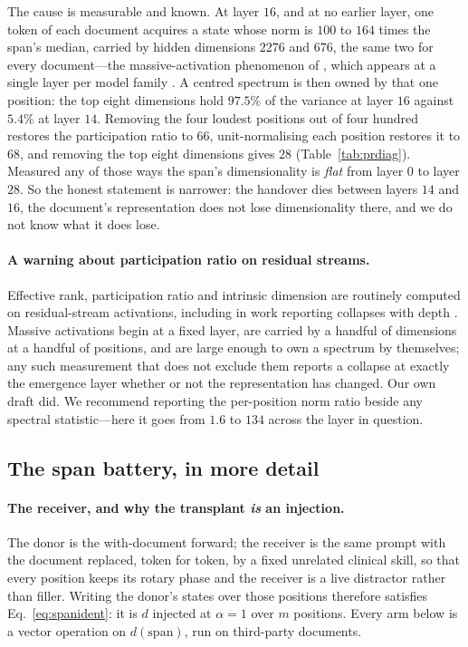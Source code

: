\documentclass{article}
\newcommand{\dvec}{\ensuremath{d}}
\begin{document}
The cause is measurable and known. At layer $16$, and at no earlier layer, one
token of each document acquires a state whose norm is $100$ to $164$ times the
span's median, carried by hidden dimensions $2276$ and $676$, the same two for
every document---the massive-activation phenomenon of \citet{sun2024massive},
which appears at a single layer per model family \citep{shi2026melayer}. A
centred spectrum is then owned by that one position: the top eight dimensions
hold $97.5\%$ of the variance at layer $16$ against $5.4\%$ at layer $14$.
Removing the four loudest positions out of four hundred restores the
participation ratio to $66$, unit-normalising each position restores it to $68$,
and removing the top eight dimensions gives $28$ (Table~\ref{tab:prdiag}).
Measured any of those ways the span's dimensionality is \emph{flat} from layer
$0$ to layer $28$. So the honest statement is narrower: the handover dies
between layers $14$ and $16$, the document's representation does not lose
dimensionality there, and we do not know what it does lose.



\paragraph{A warning about participation ratio on residual streams.} Effective
rank, participation ratio and intrinsic dimension are routinely computed on
residual-stream activations, including in work reporting collapses with depth
\citep{fernando2026residualspectral, sarkar2026causaldim}. Massive activations
begin at a fixed layer, are carried by a handful of dimensions at a handful of
positions, and are large enough to own a spectrum by themselves; any such
measurement that does not exclude them reports a collapse at exactly the
emergence layer whether or not the representation has changed. Our own draft
did. We recommend reporting the per-position norm ratio beside any spectral
statistic---here it goes from $1.6$ to $134$ across the layer in question.




\subsection{The span battery, in more detail}
\label{app:battery2}

\paragraph{The receiver, and why the transplant \emph{is} an injection.} The
donor is the with-document forward; the receiver is the same prompt with the
document replaced, token for token, by a fixed unrelated clinical skill, so that
every position keeps its rotary phase and the receiver is a live distractor
rather than filler. Writing the donor's states over those positions therefore
satisfies Eq.~\ref{eq:spanident}: it is $\dvec$ injected at $\alpha=1$ over $m$
positions. Every arm below is a vector operation on $\dvec(\text{span})$, run on
third-party documents.
\end{document}
